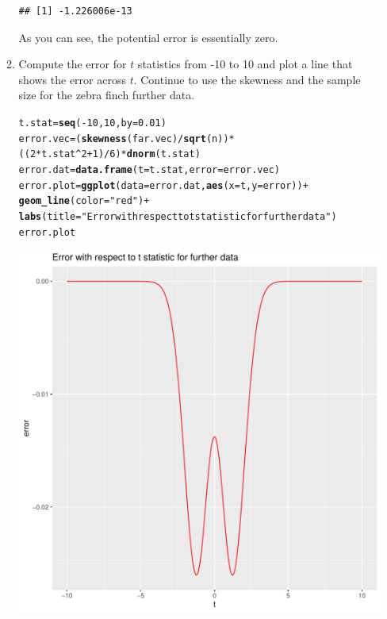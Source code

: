 \documentclass{article}\usepackage[]{graphicx}\usepackage[]{xcolor}
\makeatletter
\def\maxwidth{ %
  \ifdim\Gin@nat@width>\linewidth
    \linewidth
  \else
    \Gin@nat@width
  \fi
}
\newcommand{\hlnum}[1]{\textcolor[rgb]{0.686,0.059,0.569}{#1}}%
\newcommand{\hlsng}[1]{\textcolor[rgb]{0.192,0.494,0.8}{#1}}%
\newcommand{\hlopt}[1]{\textcolor[rgb]{0,0,0}{#1}}%
\newcommand{\hldef}[1]{\textcolor[rgb]{0.345,0.345,0.345}{#1}}%
\newcommand{\hlkwb}[1]{\textcolor[rgb]{0.69,0.353,0.396}{#1}}%
\newcommand{\hlkwc}[1]{\textcolor[rgb]{0.333,0.667,0.333}{#1}}%
\newcommand{\hlkwd}[1]{\textcolor[rgb]{0.737,0.353,0.396}{\textbf{#1}}}%
\newenvironment{kframe}{%
 \def\at@end@of@kframe{}%
 \ifinner\ifhmode%
  \def\at@end@of@kframe{\end{minipage}}%
  \begin{minipage}{\columnwidth}%
 \fi\fi%
 \def\FrameCommand##1{\hskip\@totalleftmargin \hskip-\fboxsep
 \colorbox{shadecolor}{##1}\hskip-\fboxsep
     \hskip-\linewidth \hskip-\@totalleftmargin \hskip\columnwidth}%
 \MakeFramed {\advance\hsize-\width
   \@totalleftmargin\z@ \linewidth\hsize
   \@setminipage}}%
 {\par\unskip\endMakeFramed%
 \at@end@of@kframe}
\newenvironment{knitrout}{}{} %
\makeatother
\begin{document}
\begin{enumerate}
\begin{enumerate}
\begin{knitrout}
\begin{kframe}
\begin{verbatim}
## [1] -1.226006e-13
\end{verbatim}
\end{kframe}
\end{knitrout}
As you can see, the potential error is essentially zero.\\
  \item Compute the error for $t$ statistics from -10 to 10 and plot a line
  that shows the error across $t$. Continue to use the skewness and 
  the sample size for the zebra finch further data.
\begin{knitrout}
\color{fgcolor}\begin{kframe}
\begin{alltt}
\hldef{t.stat} \hlkwb{=} \hlkwd{seq}\hldef{(}\hlopt{-}\hlnum{10}\hldef{,}\hlnum{10}\hldef{,} \hlkwc{by} \hldef{=} \hlnum{0.01}\hldef{)}
\hldef{error.vec} \hlkwb{=} \hldef{(}\hlkwd{skewness}\hldef{(far.vec)}\hlopt{/}\hlkwd{sqrt}\hldef{(n))}\hlopt{*}\hldef{((}\hlnum{2}\hlopt{*}\hldef{t.stat}\hlopt{^}\hlnum{2} \hlopt{+} \hlnum{1}\hldef{)}\hlopt{/}\hlnum{6}\hldef{)}\hlopt{*}\hlkwd{dnorm}\hldef{(t.stat)}
\hldef{error.dat} \hlkwb{=} \hlkwd{data.frame}\hldef{(}\hlkwc{t} \hldef{= t.stat,} \hlkwc{error} \hldef{= error.vec)}
\hldef{error.plot} \hlkwb{=} \hlkwd{ggplot}\hldef{(}\hlkwc{data} \hldef{= error.dat,} \hlkwd{aes}\hldef{(}\hlkwc{x} \hldef{= t,} \hlkwc{y} \hldef{= error))}\hlopt{+}
  \hlkwd{geom_line}\hldef{(}\hlkwc{color} \hldef{=} \hlsng{"red"}\hldef{)} \hlopt{+}
  \hlkwd{labs}\hldef{(}\hlkwc{title} \hldef{=} \hlsng{"Error with respect to t statistic for further data"}\hldef{)}
\hldef{error.plot}
\end{alltt}
\end{kframe}
\includegraphics[width=\maxwidth]{figure/unnamed-chunk-3-1} 

\end{knitrout}
\end{enumerate}
\end{enumerate}
\end{document}
